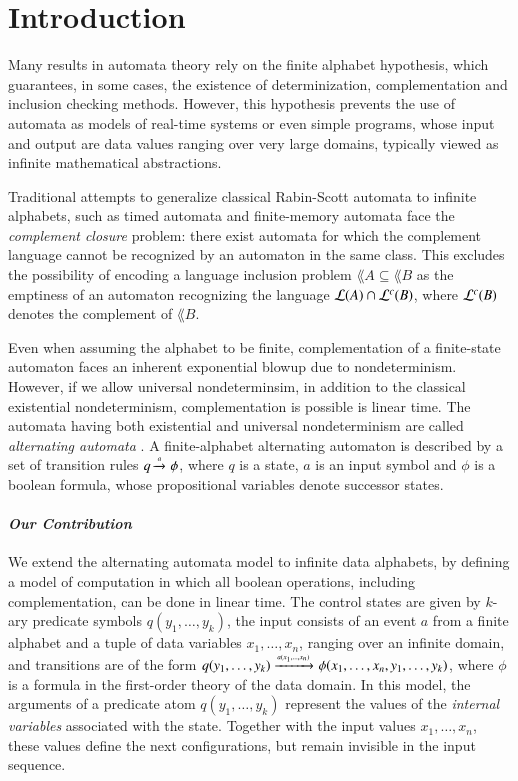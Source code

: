 \section{Introduction}

Many results in automata theory rely on the finite alphabet
hypothesis, which guarantees, in some cases, the existence of
determinization, complementation and inclusion checking
methods. However, this hypothesis prevents the use of automata as
models of real-time systems or even simple programs, whose input and
output are data values ranging over very large domains, typically
viewed as infinite mathematical abstractions.

Traditional attempts to generalize classical Rabin-Scott automata to
infinite alphabets, such as timed automata \cite{AlurDill94} and
finite-memory automata \cite{KaminskiFrancez94} face the
\emph{complement closure} problem: there exist automata for which the
complement language cannot be recognized by an automaton in the same
class. This excludes the possibility of encoding a language inclusion
problem $\lang{A} \subseteq \lang{B}$ as the emptiness of an automaton
recognizing the language ${\mathcal L}({A}) \cap {\mathcal L}^c({B})$, where ${\mathcal L}^c({B})$
denotes the complement of $\lang{B}$.

Even when assuming the alphabet to be finite, complementation of a
finite-state automaton faces an inherent exponential blowup due to
nondeterminism. However, if we allow universal nondeterminsim, in
addition to the classical existential nondeterminism, complementation
is possible is linear time. The automata having both existential and
universal nondeterminism are called \emph{alternating automata}
\cite{ChandraKozenStockmeyer81}. A finite-alphabet alternating
automaton is described by a set of transition rules $q \xrightarrow{{\scriptscriptstyle a}}_{{\scriptstyle }}
\phi$, where $q$ is a state, $a$ is an input symbol and $\phi$ is a
boolean formula, whose propositional variables denote successor
states.

\paragraph{\em Our Contribution}
We extend the alternating automata model to infinite data alphabets,
by defining a model of computation in which all boolean operations,
including complementation, can be done in linear time.  The control
states are given by $k$-ary predicate symbols $q(y_1,\ldots,y_k)$, the
input consists of an event $a$ from a finite alphabet and a tuple of
data variables $x_1,\ldots,x_n$, ranging over an infinite domain, and
transitions are of the form $q(y_1,\ldots,y_k)
\xrightarrow{{\scriptscriptstyle a(x_1,\ldots,x_n)}}_{{\scriptstyle }} \phi(x_1, \ldots, x_n, y_1, \ldots, y_k)$,
where $\phi$ is a formula in the first-order theory of the data
domain. In this model, the arguments of a predicate atom
$q(y_1,\ldots,y_k)$ represent the values of the \emph{internal
  variables} associated with the state. Together with the input values
$x_1,\ldots,x_n$, these values define the next configurations, but
remain invisible in the input sequence.

